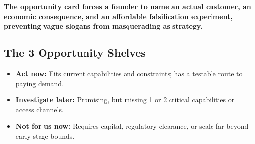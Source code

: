 \textbf{The opportunity card forces a founder to name an actual customer, an economic consequence, and an affordable falsification experiment, preventing vague slogans from masquerading as strategy.}

\subsection{The 3 Opportunity Shelves}

\begin{itemize}[leftmargin=11pt,itemsep=1.5pt,topsep=1.5pt,parsep=0pt]
  \item \textbf{Act now:} Fits current capabilities and constraints; has a testable route to paying demand.
  \item \textbf{Investigate later:} Promising, but missing 1 or 2 critical capabilities or access channels.
  \item \textbf{Not for us now:} Requires capital, regulatory clearance, or scale far beyond early-stage bounds.
\end{itemize}
